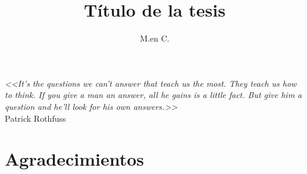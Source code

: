 \documentclass[letterpaper,12pt,oneside]{book}
\author{M.en C.}
\title{Título de la tesis}
\begin{document}
\frontmatter
\maketitle %
\chapter*{}
\begin{flushright}
	{%
	\selectfont\emph{<<It's the questions we can't answer that teach us the most. They teach us how to think. If you give a man an answer, all he gains is a little fact. But give him a question and he'll look for his own answers.>>}\\
\vspace{5mm}
	Patrick Rothfuss}

\end{flushright}
\vfill
\chapter{Agradecimientos}
\lipsum[6-9]


% 

\mainmatter





{
\backmatter

}
\renewcommand{\appendixtocname}{Anexos} %

\appendix
\noappendicestocpagenum %

\end{document}
